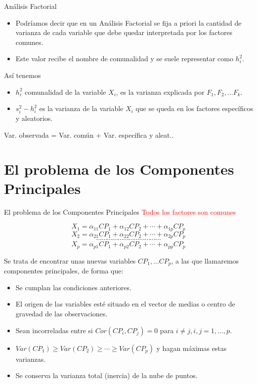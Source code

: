 \documentclass[
  spanish,
  ignorenonframetext,
]{beamer}
\providecommand{\tightlist}{%
  \setlength{\itemsep}{0pt}\setlength{\parskip}{0pt}}
\newcommand\red[1]{\textcolor{red}{#1}}
\begin{document}
\begin{frame}{Análisis Factorial}
\protect\hypertarget{anuxe1lisis-factorial-1}{}
\begin{itemize}
\tightlist
\item
  Podríamos decir que en un Análisis Factorial se fija a priori la
  cantidad de varianza de cada variable que debe quedar interpretada por
  los factores comunes.
\item
  Este valor recibe el nombre de comunalidad y se suele representar como
  \(h_i^2\).
\end{itemize}

Así tenemos

\begin{itemize}
\tightlist
\item
  \(h_i^2\) comunalidad de la variable \(X_i\), es la varianza explicada
  por \(F_1,F_2,\ldots F_k.\)
\item
  \(s_i^2-h_i^2\) es la varianza de la variable \(X_i\) que se queda en
  los factores específicos y aleatorios.
\end{itemize}

Var. observada = Var. común + Var. específica y aleat..
\end{frame}

\hypertarget{el-problema-de-los-componentes-principales}{%
\section{El problema de los Componentes
Principales}\label{el-problema-de-los-componentes-principales}}

\begin{frame}{El problema de los Componentes Principales}
\protect\hypertarget{el-problema-de-los-componentes-principales-1}{}
\red{Todos los factores son comunes}

\[X_1=\alpha_{1 1} CP_1+ \alpha_{1 2} CP_2+\cdots +\alpha_{1 p} CP_p\]
\[X_2=\alpha_{2 1} CP_1+ \alpha_{2 2} CP_2+\cdots +\alpha_{2 p} CP_p\]
\[\cdots\cdots\cdots\cdots\cdots\cdots\cdots\cdots\cdots\cdots\cdots\cdots\]
\[X_p=\alpha_{p 1} CP_1+ \alpha_{p 2} CP_2+\cdots +\alpha_{p p} CP_p\]

Se trata de encontrar unas nuevas variables \(CP_1,\ldots CP_p\), a las
que llamaremos componentes principales, de forma que:

\begin{itemize}
\tightlist
\item
  Se cumplan las condiciones anteriores.
\item
  El origen de las variables esté situado en el vector de medias o
  centro de gravedad de las observaciones.
\item
  Sean incorreladas entre si \(Cor(CP_i,CP_j)=0\) para
  \(i\not= j, i,j =1,\ldots,p\).
\item
  \(Var(CP_1)\geq Var(CP_2)\geq\cdots\geq Var(CP_p)\) y hagan máximas
  estas varianzas.
\item
  Se conserva la varianza total (inercia) de la nube de puntos.
\end{itemize}
\end{frame}
\end{document}
